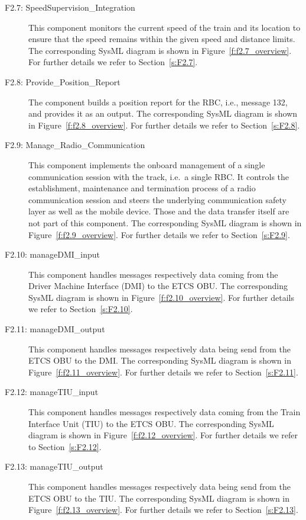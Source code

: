 \begin{description}
\item[F2.7: SpeedSupervision\_Integration] This component monitors the current speed of the train and its location to ensure that the speed remains within the given speed and distance limits. The corresponding SysML diagram is shown in Figure~\ref{f:f2.7_overview}. For further details we refer to Section~\ref{s:F2.7}.


\item[F2.8: Provide\_Position\_Report] The component builds a position report for the RBC, i.e., message 132, and provides it as an output. The corresponding SysML diagram is shown in Figure~\ref{f:f2.8_overview}. For further details we refer to Section~\ref{s:F2.8}.


\item[F2.9: Manage\_Radio\_Communication] This component implements the onboard management of a single communication session with the track, i.e.~a single RBC. It controls the establishment, maintenance and termination process of a radio communication session and steers the underlying communication safety layer as well as the mobile device. Those and the data transfer itself are not part of this component. The corresponding SysML diagram is shown in Figure~\ref{f:f2.9_overview}. For further details we refer to Section~\ref{s:F2.9}.


\item[F2.10: manageDMI\_input] This component handles messages respectively data coming from the Driver Machine Interface (DMI) to the ETCS OBU. The corresponding SysML diagram is shown in Figure~\ref{f:f2.10_overview}. For further details we refer to Section~\ref{s:F2.10}.


\item[F2.11: manageDMI\_output] This component handles messages respectively data being send from the ETCS OBU to the DMI. The corresponding SysML diagram is shown in Figure~\ref{f:f2.11_overview}. For further details we refer to Section~\ref{s:F2.11}.


\item[F2.12: manageTIU\_input] This component handles messages respectively data coming from the Train Interface Unit (TIU) to the ETCS OBU. The corresponding SysML diagram is shown in Figure~\ref{f:f2.12_overview}. For further details we refer to Section~\ref{s:F2.12}.


\item[F2.13: manageTIU\_output] This component handles messages respectively data being send from the ETCS OBU to the TIU. The corresponding SysML diagram is shown in Figure~\ref{f:f2.13_overview}. For further details we refer to Section~\ref{s:F2.13}.
\end{description}

